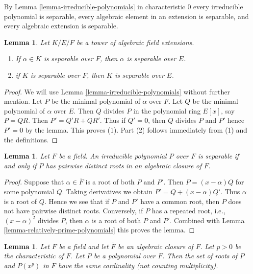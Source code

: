 \documentclass{stacks-project}
\theoremstyle{plain}
\newtheorem{lemma}[subsection]{Lemma}
\theoremstyle{definition}
\theoremstyle{remark}
\numberwithin{equation}{subsection}
\begin{document}
\noindent
By Lemma \ref{lemma-irreducible-polynomials} in characteristic $0$ every
irreducible polynomial is separable, every algebraic element in an extension
is separable, and every algebraic extension is separable.

\begin{lemma}
\label{lemma-separable-goes-up}
Let $K/E/F$ be a tower of algebraic field extensions.
\begin{enumerate}
\item If $\alpha \in K$ is separable over $F$, then $\alpha$ is separable
over $E$.
\item if $K$ is separable over $F$, then $K$ is separable over $E$.
\end{enumerate}
\end{lemma}

\begin{proof}
We will use Lemma \ref{lemma-irreducible-polynomials} without further mention.
Let $P$ be the minimal polynomial of $\alpha$ over $F$.
Let $Q$ be the minimal polynomial of $\alpha$ over $E$.
Then $Q$ divides $P$ in the polynomial ring $E[x]$, say $P = QR$.
Then $P' = Q'R + QR'$. Thus if $Q' = 0$, then $Q$ divides $P$ and $P'$
hence $P' = 0$ by the lemma. This proves (1). Part (2)
follows immediately from (1) and the definitions.
\end{proof}

\begin{lemma}
\label{lemma-recognize-separable}
Let $F$ be a field. An irreducible polynomial $P$ over $F$
is separable if and only if $P$ has pairwise distinct roots in an
algebraic closure of $F$.
\end{lemma}

\begin{proof}
Suppose that $\alpha \in \overline{F}$ is a root of both $P$ and $P'$.
Then $P = (x - \alpha)Q$ for some polynomial $Q$. Taking derivatives
we obtain $P' = Q + (x - \alpha)Q'$. Thus $\alpha$ is a root of $Q$.
Hence we see that if $P$ and $P'$ have a common root, then $P$
does not have pairwise distinct roots. Conversely, if $P$ has
a repeated root, i.e., $(x - \alpha)^2$ divides $P$, then $\alpha$
is a root of both $P$ and $P'$. Combined with
Lemma \ref{lemma-relatively-prime-polynomials} this proves the lemma.
\end{proof}

\begin{lemma}
\label{lemma-nr-roots-unchanged}
Let $F$ be a field and let $\overline{F}$ be an algebraic closure of $F$.
Let $p > 0$ be the characteristic of $F$. Let $P$ be a polynomial
over $F$. Then the set of roots of $P$ and $P(x^p)$ in $\overline{F}$
have the same cardinality (not counting multiplicity).
\end{lemma}
\end{document}
